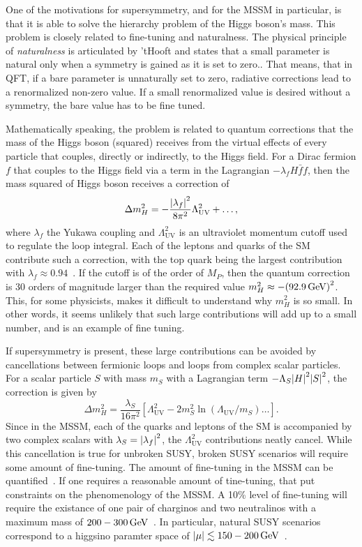 One of the motivations for supersymmetry, and for the MSSM in particular, is that it is able to solve the hierarchy problem of the Higgs boson's mass. This problem is closely related to fine-tuning and naturalness. The physical principle of \emph{naturalness} is articulated by ’tHooft and states that a small parameter is natural only when a symmetry is gained as it is set to zero.\cite{tHooft:1980xss,Seiberg_1993}. That means, that in QFT, if a bare parameter is unnaturally set to zero, radiative corrections lead to a renormalized non-zero value. If a small renormalized value is desired without a symmetry, the bare value has to be fine tuned.

Mathematically speaking, the problem is related to quantum corrections that the mass of the Higgs boson (squared) receives from the virtual effects of every particle that couples, directly or indirectly, to the Higgs field. For a Dirac fermion $f$ that couples to the Higgs field via a term in the Lagrangian $-\lambda_f H \bar{f}f$, then the mass squared of Higgs boson receives a correction of
\begin{equation}
\Delta m^2_H = -\frac{\abs{\lambda_f}^2}{8\pi^2}\Lambda^2_{\mathrm{UV}}+\ldots,
\end{equation} 
where $\lambda_f$ the Yukawa coupling and $\Lambda^2_{\mathrm{UV}}$ is an ultraviolet momentum cutoff used to regulate the loop integral. Each of the leptons and quarks of the SM contribute such a correction, with the top quark being the largest contribution with $\lambda_f\approx 0.94$~\cite{MARTIN_1998}. If the cutoff is of the order of $M_P$, then the quantum correction is 30 orders of magnitude larger than the required value $m^2_H\approx-\qty(92.9\,\text{Ge\hspace{-.08em}V})^2$. This, for some physicists, makes it difficult to understand why $m^2_H$ is so small. In other words, it seems unlikely that such large contributions will add up to a small number, and is an example of fine tuning.

If supersymmetry is present, these large contributions can be avoided by cancellations between fermionic loops and loops from complex scalar particles. For a scalar particle $S$ with mass $m_S$ with a Lagrangian term $-\Lambda_S\abs{H}^2\abs{S}^2$, the correction is given by
\begin{equation}
\Delta m^2_H = \frac{\lambda_S}{16\pi^2}\left[\Lambda^2_{\mathrm{UV}} -2m_S^2\ln(\Lambda_{\mathrm{UV}}/m_S) \ldots\right].
\end{equation}
Since in the MSSM, each of the quarks and leptons of the SM is accompanied by two complex scalars with $\lambda_S=\abs{\lambda_f}^2$, the $\Lambda^2_{\mathrm{UV}}$ contributions neatly cancel. While this cancellation is true for unbroken SUSY, broken SUSY scenarios will require some amount of fine-tuning. The amount of fine-tuning in the MSSM can be quantified~\cite{Feng_2013,PhysRevD.58.096004}. If one requires a reasonable amount of tine-tuning, that put constraints on the phenomenology of the MSSM. A 10\% level of fine-tuning will require the existance of one pair of charginos and two neutralinos with a maximum mass of $200-300\,\text{Ge\hspace{-.08em}V}$~\cite{natural-SUSY,BARBIERI198863,Antusch_2013,Papucci_2012}. In particular, natural SUSY scenarios correspond to a higgsino paramter space of $\abs{\mu}\lesssim 150-200\,\text{Ge\hspace{-.08em}V}$~\cite{Baer_2012}.
